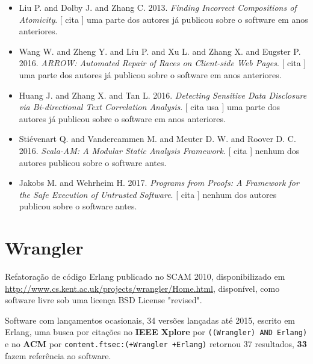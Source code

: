 \begin{itemize}
\item Liu P. and Dolby J. and Zhang C.
      2013.
        \textit{ Finding Incorrect Compositions of Atomicity}.
      [
          cita
      ]
uma parte dos autores já publicou sobre o software em anos anteriores.
\item Wang W. and Zheng Y. and Liu P. and Xu L. and Zhang X. and Eugster P.
      2016.
        \textit{ ARROW: Automated Repair of Races on Client-side Web Pages}.
      [
          cita
      ]
uma parte dos autores já publicou sobre o software em anos anteriores.
\item Huang J. and Zhang X. and Tan L.
      2016.
        \textit{ Detecting Sensitive Data Disclosure via Bi-directional Text Correlation Analysis}.
      [
          cita
          usa
      ]
uma parte dos autores já publicou sobre o software em anos anteriores.
\item Stiévenart Q. and Vandercammen M. and Meuter D. W. and Roover D. C.
      2016.
        \textit{ Scala-AM: A Modular Static Analysis Framework}.
      [
          cita
      ]
nenhum dos autores publicou sobre o software antes.
\item Jakobs M. and Wehrheim H.
      2017.
        \textit{ Programs from Proofs: A Framework for the Safe Execution of Untrusted Software}.
      [
          cita
      ]
nenhum dos autores publicou sobre o software antes.
\end{itemize}
\section{Wrangler}

Refatoração de código Erlang
publicado no SCAM 2010,
disponibilizado em \url{http://www.cs.kent.ac.uk/projects/wrangler/Home.html},
disponível,
como software livre
sob uma licença BSD License "revised".

Software com lançamentos ocasionais,
34 versões lançadas
até 2015,
escrito em Erlang,
uma busca por citações no {\bf IEEE Xplore} por
\texttt{((Wrangler) AND Erlang)}
e no {\bf ACM} por
\texttt{content.ftsec:(+Wrangler +Erlang)}
retornou
37 resultados,
{\bf 33} fazem referência ao software.


